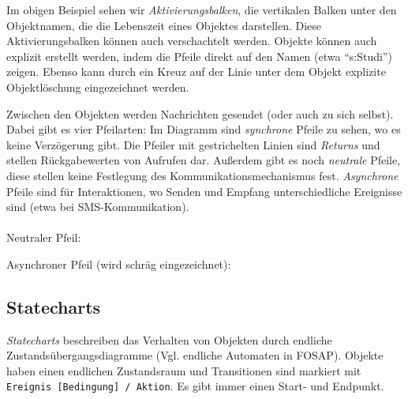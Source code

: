 \documentclass[a4paper,parskip=half*,DIV=7,fontsize=11pt]{scrartcl}
\begin{document}

Im obigen Beispiel sehen wir \emph{Aktivierungsbalken}, die vertikalen Balken unter den Objektnamen, die die Lebenszeit eines Objektes darstellen. Diese Aktivierungsbalken können auch verschachtelt werden. Objekte können auch explizit erstellt werden, indem die Pfeile direkt auf den Namen (etwa ``s:Studi'') zeigen. Ebenso kann durch ein Kreuz auf der Linie unter dem Objekt explizite Objektlöschung eingezeichnet werden.

Zwischen den Objekten werden Nachrichten gesendet (oder auch zu sich selbst). Dabei gibt es vier Pfeilarten: Im Diagramm sind \emph{synchrone} Pfeile zu sehen, wo es keine Verzögerung gibt. Die Pfeiler mit gestrichelten Linien sind \emph{Returns} und stellen Rückgabewerten von Aufrufen dar. Außerdem gibt es noch \emph{neutrale} Pfeile, diese stellen keine Festlegung des Kommunikationsmechanismus fest. \emph{Asynchrone} Pfeile sind für Interaktionen, wo Senden und Empfang unterschiedliche Ereignisse sind (etwa bei SMS-Kommunikation).
~\\~\\
Neutraler Pfeil: 

Asynchroner Pfeil (wird schräg eingezeichnet): 

\subsection{Statecharts}
\label{sec:statecharts}

\emph{Statecharts} beschreiben das Verhalten von Objekten durch endliche  Zustandsübergangsdiagramme (Vgl. endliche Automaten in FOSAP). Objekte haben einen endlichen Zustandsraum und Transitionen sind markiert mit \lstinline{Ereignis [Bedingung] / Aktion}. Es gibt immer einen Start- und Endpunkt.
\end{document}
